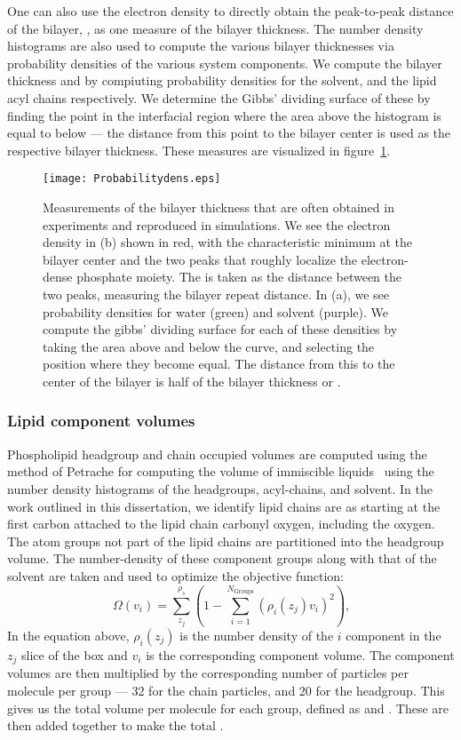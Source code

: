 One can also use the electron density to directly obtain the peak-to-peak distance of the bilayer, \dhh{}, as one measure
of the bilayer thickness. 
The number density histograms are also used to compute the various bilayer thicknesses via probability densities
of the various system components. We compute the bilayer thickness \db{} and \dc{} by compiuting probability densities
for the solvent, and the lipid acyl chains respectively. We determine the Gibbs' dividing surface of these by finding the point in the interfacial region
where the area above the histogram is equal to below --- the distance from this point to the bilayer center is used as the respective bilayer thickness.
These measures are visualized in figure~\ref{figch1:thicknesses}.
\begin{figure}[h!tb]
    \caption[Diagram of bilayer thickness measurements]{Measurements of the bilayer thickness that are often obtained in experiments and reproduced in simulations. We see the electron density in (b) shown in red,
    with the characteristic minimum at the bilayer center and the two peaks that roughly localize the electron-dense phosphate moiety. The \dhh{} is taken as the distance between the two peaks,
    measuring the bilayer repeat distance. In (a), we see probability densities for water (green) and solvent (purple). We compute the gibbs' dividing surface for each of these densities by taking the area 
    above and below the curve, and selecting the position where they become equal. The distance from this to the center of the bilayer is half of the bilayer thickness \db{} or \dc{}.}
    \label{figch1:thicknesses}
    \texttt{[image: Probabilitydens.eps]}
\end{figure}
\subsubsection{Lipid component volumes}
Phospholipid headgroup and chain occupied volumes are computed using the method of Petrache \etal{} for computing the
volume of immiscible liquids~\cite{petrache:1997} using the number density histograms of the headgroups, acyl-chains, and solvent.
In the work outlined in this dissertation, we identify lipid chains are as starting 
at the first carbon attached to the lipid chain carbonyl oxygen, including the oxygen.
The atom groups not part of the lipid
chains are partitioned into the headgroup volume. 
The number-density of these component groups along with that of the solvent are taken 
and used to optimize the objective function:
\begin{equation}
    \label{eq:volumeobj}
    \Omega(v_i)=\sum^{\rho_s}_{z_j}(1-\sum^{N_{\text{Groups}}}_{i=1}{(\rho_i(z_j)v_i)^2})\text{,}
\end{equation}
In the equation above, $\rho_i(z_j)$ is the number density of the $i$ component in the
$z_j$ slice of the box and $v_i$ is the corresponding component volume. 
The component volumes are then multiplied by the corresponding
number of particles per molecule per group --- 32 for the chain
particles, and 20 for the headgroup. 
This gives us the total volume per molecule for each group, defined as \Vh{} and \Vc{}. These are then
added together to make the total \Vl{}.
